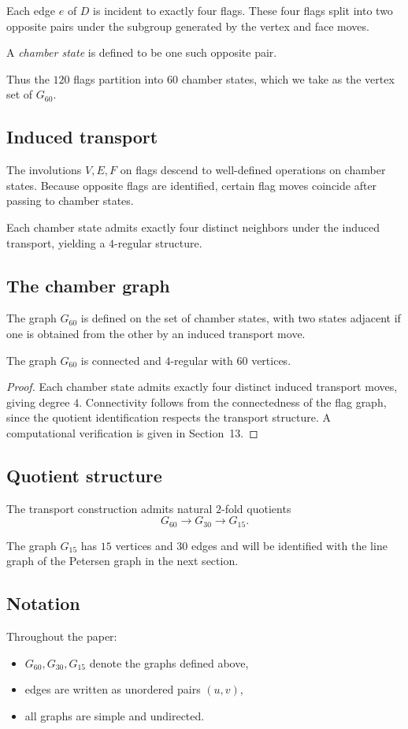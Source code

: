 Each edge $e$ of $D$ is incident to exactly four flags. These four flags
split into two opposite pairs under the subgroup generated by the vertex
and face moves.

A \emph{chamber state} is defined to be one such opposite pair.

Thus the $120$ flags partition into $60$ chamber states, which we take
as the vertex set of $G_{60}$.

\subsection{Induced transport}

The involutions $V,E,F$ on flags descend to well-defined operations on
chamber states. Because opposite flags are identified, certain flag moves
coincide after passing to chamber states.

Each chamber state admits exactly four distinct neighbors under the
induced transport, yielding a $4$-regular structure.

\subsection{The chamber graph}

The graph $G_{60}$ is defined on the set of chamber states, with two
states adjacent if one is obtained from the other by an induced transport
move.

\begin{proposition}
The graph $G_{60}$ is connected and $4$-regular with $60$ vertices.
\end{proposition}

\begin{proof}
Each chamber state admits exactly four distinct induced transport moves,
giving degree $4$. Connectivity follows from the connectedness of the
flag graph, since the quotient identification respects the transport
structure. A computational verification is given in Section~13.
\end{proof}

\subsection{Quotient structure}

The transport construction admits natural $2$-fold quotients
\[
G_{60} \longrightarrow G_{30} \longrightarrow G_{15}.
\]

The graph $G_{15}$ has $15$ vertices and $30$ edges and will be
identified with the line graph of the Petersen graph in the next
section.

\subsection{Notation}

Throughout the paper:
\begin{itemize}
\item $G_{60}, G_{30}, G_{15}$ denote the graphs defined above,
\item edges are written as unordered pairs $(u,v)$,
\item all graphs are simple and undirected.
\end{itemize}

